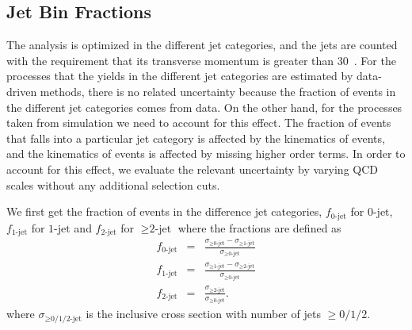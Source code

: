 \subsection{Jet Bin Fractions}
\label{sec:jetbinfrac}

The analysis is optimized in the different jet categories, 
and the jets are counted with the requirement that  
its transverse momentum is greater than 30~\GeV. For the processes that the yields in the 
different jet categories are estimated by data-driven methods, there is no related uncertainty 
because the fraction of events in the different jet categories comes from data. 
On the other hand, for the processes taken from simulation we need to account for this effect.    
The fraction of events that falls into a particular jet category is 
affected by the kinematics of events, and the kinematics of events is affected 
by missing higher order terms. 
In order to account for this effect, we evaluate the relevant uncertainty by varying 
QCD scales without any additional selection cuts.

We first get the fraction of events in the difference jet categories, 
$f_\textrm{0-jet}$ for $\textrm{0-jet}$, $f_\textrm{1-jet}$ for $\textrm{1-jet}$ 
and $f_\textrm{2-jet}$ for $\ge\textrm{2-jet}$ where the fractions are defined as 
\begin{eqnarray} 
f_\textrm{0-jet} 
&=&  
\frac{\sigma_{\ge\textrm{0-jet}} - \sigma_{\ge\textrm{1-jet}}}{\sigma_{\ge\textrm{0-jet}}} \\
f_\textrm{1-jet} 
&=&  
\frac{\sigma_{\ge\textrm{1-jet}} - \sigma_{\ge\textrm{2-jet}}}{\sigma_{\ge\textrm{0-jet}}} \\
f_\textrm{2-jet} 
&=&  
\frac{\sigma_{\ge\textrm{2-jet}}}{\sigma_{\ge\textrm{0-jet}}}.
\end{eqnarray}  
where $\sigma_{\ge\textrm{0/1/2-jet}}$ is the inclusive cross section 
with number of jets $\ge 0/1/2$.


